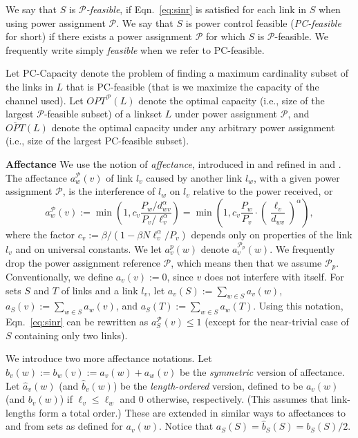 \documentclass[11pt]{amsart}
\newcommand{\cal}[1]{\mathcal{#1}}
\newcommand{\header}[1]{\smallskip\noindent\textbf{#1}\quad}
\def\calP{{\cal P}}
\newcommand{\prob}[1]{\textsf{#1}}  \newcommand{\alg}[1]{\textbf{#1}}
\def\calP{{\cal P}}   \def\calM{{\cal M}}   \def\calU{{\cal U}}   \newcommand{\PCopt}{\overline{OPT}}
\newcommand{\powp}{\calP_p}
\begin{document}
We say that $S$ is \emph{$\calP$-feasible}, if Eqn.\ \ref{eq:sinr} is
satisfied for each link in $S$ when using power assignment $\calP$.
We say that $S$ is power control feasible (\emph{PC-feasible} for short) if there exists a power
assignment $\calP$ for which $S$ is $\calP$-feasible.
We frequently write simply \emph{feasible} when we refer to PC-feasible.

Let \prob{PC-Capacity} denote the problem of finding a maximum
cardinality subset of the links in $L$ that is PC-feasible (that is we maximize the capacity of the channel used).
Let $OPT^{\calP}(L)$ denote the optimal capacity (i.e., size of the largest $\calP$-feasible subset) of a linkset $L$ under
power assignment $\calP$, and $\PCopt(L)$ denote the optimal capacity under
any arbitrary power assignment (i.e., size of the largest PC-feasible subset). 

\header{Affectance}
We use the notion of \emph{affectance}, introduced in
\cite{GHWW09} and refined in \cite{HW09} and \cite{KV10}.  
The affectance $a^\calP_w(v)$ of link $l_v$ caused by another link $l_w$,
with a given power assignment $\calP$,
is the interference of $l_w$ on $l_v$ relative to the power
received, or
\[ a^\calP_{w}(v) := 
  \min\left(1,c_v \frac{P_w/d_{wv}^\alpha}{P_v/\ell_v^\alpha}\right)
   = \min\left(1, c_v \frac{P_w}{P_v} \cdot \left(\frac{\ell_v}{d_{wv}}\right)^\alpha\right), \]
where the factor $c_v := \beta/(1 - \beta N \ell_v^\alpha/P_v)$
depends only on properties of the link $l_v$ and on universal constants. 
We let $a^p_v(w)$ denote $a^{\powp}_v(w)$.
We frequently drop the power assignment reference $\calP$, which means then that we assume $\calP_p$.
Conventionally,  we define $a_v(v) := 0$, since $v$ does not interfere with itself.
For sets $S$ and $T$ of links and a link $l_v$, 
let $a_v(S) := \sum_{w \in S} a_v(w)$, $a_S(v) := \sum_{w \in S} a_w(v)$, and $a_S(T) := \sum_{w\in S} a_w(T)$.
Using this notation, Eqn.\ \ref{eq:sinr} can be rewritten as $a^\calP_S(v) \leq 1$
(except for the near-trivial case of $S$ containing only two links).



We introduce two more affectance notations.
Let $b_v(w) := b_w(v) := a_v(w) + a_w(v)$ be the \emph{symmetric} version of affectance.
Let $\hat{a}_v(w)$ (and $\hat{b}_v(w)$) be the \emph{length-ordered} version,
defined to be $a_v(w)$ (and $b_v(w)$) if $\ell_v \leq \ell_w$ and 0
otherwise, respectively. (This assumes that link-lengths form a total order.)
These are extended in similar ways to affectances to and from sets as
defined for $a_v(w)$. Notice that $a_S(S) = \hat{b}_S(S) = b_S(S)/2$.
\end{document}
